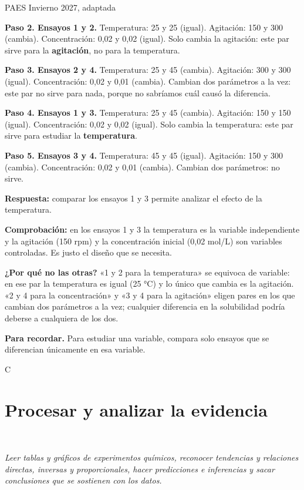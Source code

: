 \begin{elejemplo}{PAES Invierno 2027, adaptada}
{\textbf{Paso 2. Ensayos 1 y 2.} Temperatura: 25 y 25 (igual). Agitación: 150 y 300 (cambia). Concentración: 0,02 y 0,02 (igual). Solo cambia la agitación: este par sirve para la \textbf{agitación}, no para la temperatura.

\textbf{Paso 3. Ensayos 2 y 4.} Temperatura: 25 y 45 (cambia). Agitación: 300 y 300 (igual). Concentración: 0,02 y 0,01 (cambia). Cambian dos parámetros a la vez: este par no sirve para nada, porque no sabríamos cuál causó la diferencia.

\textbf{Paso 4. Ensayos 1 y 3.} Temperatura: 25 y 45 (cambia). Agitación: 150 y 150 (igual). Concentración: 0,02 y 0,02 (igual). Solo cambia la temperatura: este par sirve para estudiar la \textbf{temperatura}. 

\textbf{Paso 5. Ensayos 3 y 4.} Temperatura: 45 y 45 (igual). Agitación: 150 y 300 (cambia). Concentración: 0,02 y 0,01 (cambia). Cambian dos parámetros: no sirve.

\textbf{Respuesta:} comparar los ensayos 1 y 3 permite analizar el efecto de la temperatura.

\textbf{Comprobación:} en los ensayos 1 y 3 la temperatura es la variable independiente y la agitación (150 rpm) y la concentración inicial (0,02 mol/L) son variables controladas. Es justo el diseño que se necesita.

\textbf{¿Por qué no las otras?} «1 y 2 para la temperatura» se equivoca de variable: en ese par la temperatura es igual (25 °C) y lo único que cambia es la agitación. «2 y 4 para la concentración» y «3 y 4 para la agitación» eligen pares en los que cambian dos parámetros a la vez; cualquier diferencia en la solubilidad podría deberse a cualquiera de los dos.

\textbf{\color{cienciaD}Para recordar.} Para estudiar una variable, compara solo ensayos que se diferencian únicamente en esa variable.}{C}
\end{elejemplo}

\section[Procesar y analizar la evidencia]{Procesar y analizar la evidencia}
\modcomun\ \ {\color{gris}\itshape Leer tablas y gráficos de experimentos químicos, reconocer tendencias y relaciones directas, inversas y proporcionales, hacer predicciones e inferencias y sacar conclusiones que se sostienen con los datos.\par}
